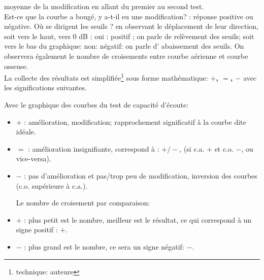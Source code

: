 moyenne de la 
modification en allant du 
premier au second test.
\\
Est-ce que la courbe a bougé, y a-t-il eu une modification? : réponse  positive ou négative.
Où se dirigent les seuils ? 
en observant le déplacement de leur direction, soit vers le haut, vers 0 dB : oui : positif ; on parle de 
relèvement des seuils; soit vers le bas du graphique: non: négatif: on parle d' abaissement des seuils.
On observera  également  le nombre de croisements entre courbe aérienne et courbe osseuse.
\\
La collecte des résultats est simplifiée\footnote{technique: auteure} sous 
forme 
mathématique:  \textbf{ $+$, $=$, $-$ } avec les significations suivantes.

Avec  le graphique des courbes du test de capacité d'écoute: 
\begin{itemize}
	\item$+$   : amélioration, modification;  rapprochement significatif à la courbe dite idéale.
	\item$=$   : amélioration insignifiante, correspond à : $+/-$, (si c.a. $ + $ et c.o. $-$, ou vice-versa).
	\item$-$   : pas d'amélioration et pas/trop peu  de modification, inversion
	des courbes (c.o. supérieure à c.a.).
	
	Le nombre de croisement par comparaison:
	\item $+$ : plus petit est le nombre, meilleur est le résultat, ce qui correspond à un signe positif : $+$.
	\item$-$   : plus grand est le nombre, ce sera un signe négatif: $-$.
\end{itemize}



